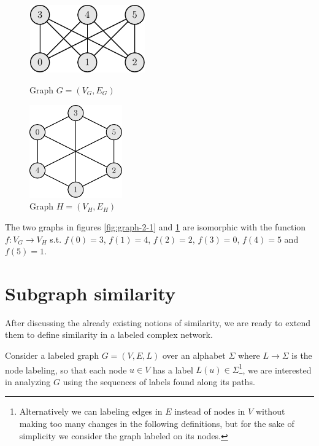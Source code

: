 \begin{esempio}
	\begin{figure}[ht]
		\centering
		\begin{minipage}[t]{.45\textwidth}
			\centering
			\includegraphics[width=5cm,height=2.92cm]{figure/figure-2-3}
			\caption{Graph $G=(V_G, E_G)$}
			\label{fig:graph-2-1}
		\end{minipage}\hfill
		\begin{minipage}[t]{.45\textwidth}
			\centering
			\includegraphics[width=4cm,height=4cm]{figure/figure-2-4}
			\caption{Graph $H=(V_H, E_H)$}
			\label{fig:graph-2-2}
		\end{minipage}
	\end{figure}
	
	The two graphs in figures \ref{fig:graph-2-1} and \ref{fig:graph-2-2} are isomorphic with the function $f : V_{G} \rightarrow V_{H}$ s.t. $f(0) = 3$, $f(1) = 4$, $f(2) = 2$, $f(3) = 0$, $f(4) = 5$ and $f(5) = 1$. 
	
\end{esempio}

\section{Subgraph similarity}

After discussing the already existing notions of similarity, we are ready to extend them to define similarity in a labeled complex network.\medskip

Consider a labeled graph $G = (V, E, L)$ over an alphabet $\Sigma$ where $L \rightarrow \Sigma$ is the node labeling, so that each node $u \in V$ has a label $L(u) \in \Sigma$\footnote{Alternatively we can labeling edges in $E$ instead of nodes in $V$ without making too many changes in the following definitions, but for the sake of simplicity we consider the graph labeled on its nodes.}, we are interested in analyzing $G$ using the sequences of labels found along  its paths.\medskip

